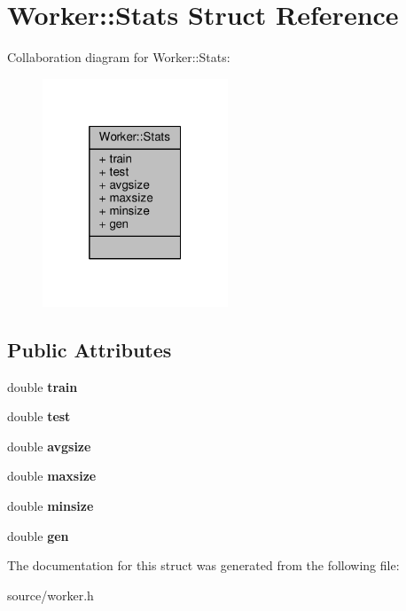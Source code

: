 \hypertarget{structWorker_1_1Stats}{}\section{Worker\+:\+:Stats Struct Reference}
\label{structWorker_1_1Stats}


Collaboration diagram for Worker\+:\+:Stats\+:
\nopagebreak
\begin{figure}[H]
\begin{center}
\leavevmode
\includegraphics[width=157pt]{structWorker_1_1Stats__coll__graph}
\end{center}
\end{figure}
\subsection*{Public Attributes}
\begin{DoxyCompactItemize}
\item 
\hypertarget{structWorker_1_1Stats_afa4ac31dd6f66421c766e24b8ea31021}{}double {\bfseries train}\label{structWorker_1_1Stats_afa4ac31dd6f66421c766e24b8ea31021}

\item 
\hypertarget{structWorker_1_1Stats_a9d0473d4ac1c37896cdf99e431ba9564}{}double {\bfseries test}\label{structWorker_1_1Stats_a9d0473d4ac1c37896cdf99e431ba9564}

\item 
\hypertarget{structWorker_1_1Stats_a77911ac9d1453454291186928a775ac7}{}double {\bfseries avgsize}\label{structWorker_1_1Stats_a77911ac9d1453454291186928a775ac7}

\item 
\hypertarget{structWorker_1_1Stats_a205caf72b0bfde3224de9e464546606e}{}double {\bfseries maxsize}\label{structWorker_1_1Stats_a205caf72b0bfde3224de9e464546606e}

\item 
\hypertarget{structWorker_1_1Stats_a20c63fe5e2fee97b0ae04dcfd4cc29ad}{}double {\bfseries minsize}\label{structWorker_1_1Stats_a20c63fe5e2fee97b0ae04dcfd4cc29ad}

\item 
\hypertarget{structWorker_1_1Stats_a4d79155d9f6534c939e73662cdb714ed}{}double {\bfseries gen}\label{structWorker_1_1Stats_a4d79155d9f6534c939e73662cdb714ed}

\end{DoxyCompactItemize}


The documentation for this struct was generated from the following file\+:\begin{DoxyCompactItemize}
\item 
source/worker.\+h\end{DoxyCompactItemize}
